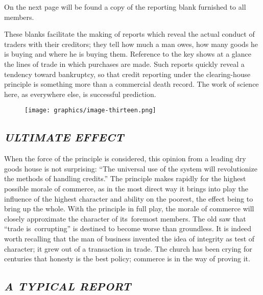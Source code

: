 \documentclass[openany,nobib]{tufte-book}
\begin{document}
On the next page will be found a copy of the reporting blank furnished
to all members.~

These blanks facilitate the making of reports which reveal the actual
conduct of traders with their creditors; they tell how much a man owes,
how many goods he is buying and where he is buying them. Reference to
the key shows at a glance the lines of trade in which purchases are
made. Such reports quickly reveal a tendency toward bankruptcy, so that
credit reporting under the clearing-house principle is something more
than a commercial death record. The work of science here, as everywhere
else, is successful prediction.~

\begin{figure}  \texttt{[image: graphics/image-thirteen.png]} %
   \label{fig:fig13}
\end{figure}


\hypertarget{ultimate-effect}{%
\subsection{\texorpdfstring{\emph{ULTIMATE
EFFECT}}{ULTIMATE EFFECT}}\label{ultimate-effect}}

When the force of the principle is considered, this opinion from a
leading dry goods house is not surprising: ``The universal use of the
system will revolutionize the methods of handling credits.'' The
principle makes rapidly for the highest possible morale of commerce, as
in the most direct way it brings into play the influence of the highest
character and ability on the poorest, the effect being to bring up the
whole. With the principle in full play, the morale of commerce will
closely approximate the character of its~foremost members. The old saw
that ``trade is~corrupting'' is destined to become worse than
groundless. It is indeed worth recalling that the man of business
invented the idea of integrity as test of character; it grew out of a
transaction in trade. The church has been crying for centuries that
honesty is the best policy; commerce is in the way of proving it.~~


\hypertarget{a-typical-report}{%
\subsection{\texorpdfstring{\emph{A TYPICAL
REPORT}}{A TYPICAL REPORT}}\label{a-typical-report}}
\end{document}
